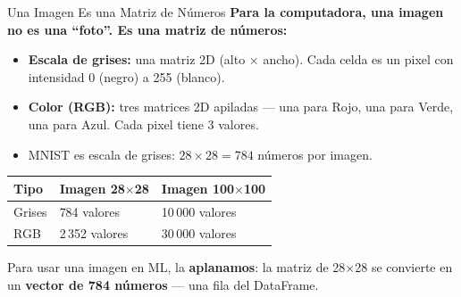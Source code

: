 \documentclass[aspectratio=169, 11pt]{beamer}
\begin{document}
\begin{frame}{Una Imagen Es una Matriz de N\'umeros}
  \vspace{-4pt}
  {\footnotesize\color{arcaDark}\bfseries
    Para la computadora, una imagen no es una ``foto''.
    Es una \textbf{matriz de n\'umeros}:}

  \vspace{6pt}
  {\footnotesize
  \begin{itemize}\setlength{\itemsep}{5pt}
    \item[{\color{arcaRed}\scriptsize\faArrowRight}]
      \textbf{Escala de grises:} una matriz 2D (alto $\times$ ancho).
      Cada celda es un pixel con intensidad 0 (negro) a 255 (blanco).
    \item[{\color{arcaRed}\scriptsize\faArrowRight}]
      \textbf{Color (RGB):} tres matrices 2D apiladas --- una para
      Rojo, una para Verde, una para Azul. Cada pixel tiene 3 valores.
    \item[{\color{codeGreen}\scriptsize\faArrowRight}]
      MNIST es escala de grises: $28 \times 28 = 784$ n\'umeros por imagen.
  \end{itemize}
  }

  \vspace{4pt}
  {\scriptsize
  \begin{tabular}{@{}lll@{}}
    \toprule
    \textbf{Tipo} & \textbf{Imagen 28$\times$28} & \textbf{Imagen 100$\times$100} \\
    \midrule
    Grises & 784 valores & 10\,000 valores \\
    RGB & 2\,352 valores & 30\,000 valores \\
    \bottomrule
  \end{tabular}
  }

  \vspace{4pt}
  {\scriptsize\color{textMuted}
    \faLightbulb\hspace{4pt} Para usar una imagen en ML, la \textbf{aplanamos}:
    la matriz de 28$\times$28 se convierte en un \textbf{vector de 784 n\'umeros}
    --- una fila del DataFrame.}
\end{frame}
\end{document}
